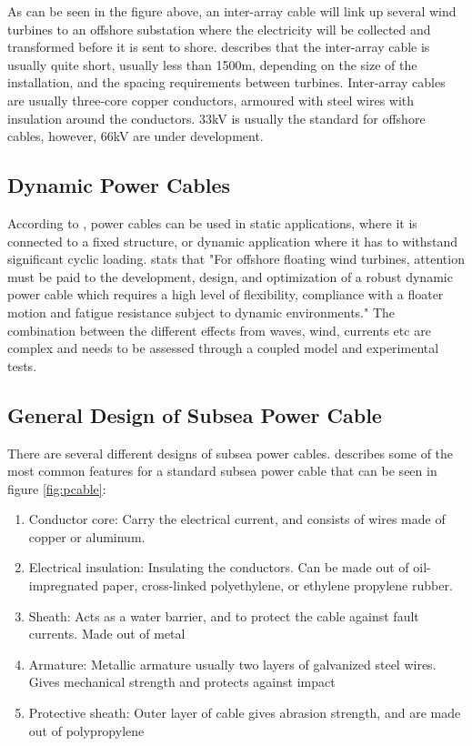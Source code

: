 \noindent As can be seen in the figure above, an inter-array cable will link up several wind turbines to an offshore substation where the electricity will be collected and transformed before it is sent to shore. \cite{srinil2016} describes that the inter-array cable is usually quite short, usually less than 1500m, depending on the size of the installation, and the spacing requirements between turbines. Inter-array cables are usually three-core copper conductors, armoured with steel wires with insulation around the conductors. 33kV is usually the standard for offshore cables, however, 66kV are under development. \newline
\newline
  
  \subsection{Dynamic Power Cables}
According to \cite{Thies2012}, power cables can be used in static applications, where it is connected to a fixed structure, or dynamic application where it has to withstand significant cyclic loading. \cite{srinil2016} stats that "For offshore floating wind turbines, attention must be paid to the development, design, and optimization of a robust dynamic power cable which requires a high level of flexibility, compliance with a floater motion and fatigue resistance subject to dynamic environments." The combination between the different effects from waves, wind, currents etc are complex and needs to be assessed through a coupled model and experimental tests. 

\subsection{General Design of Subsea Power Cable}
There are several different designs of subsea power cables. \cite{Thies2012} describes some of the most common features for a standard subsea power cable that can be seen in figure \ref{fig:pcable}: 

\begin{enumerate}[label=\Alph*]
\item Conductor core: Carry the electrical current, and consists of wires made of copper or aluminum. 
\item Electrical insulation: Insulating the conductors. Can be made out of oil-impregnated paper, cross-linked polyethylene, or ethylene propylene rubber.
\item Sheath: Acts as a water barrier, and to protect the cable against fault currents. Made out of metal
\item Armature: Metallic armature usually two layers of galvanized steel wires. Gives mechanical strength and protects against impact
\item Protective sheath: Outer layer of cable gives abrasion strength, and are made out of polypropylene
\end{enumerate}

